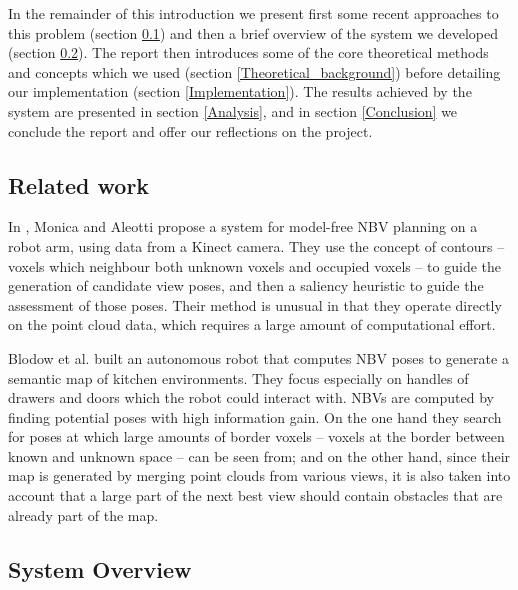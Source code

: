 In the remainder of this introduction we present first some recent approaches to this problem (section \ref{sub:related_work}) and then a brief overview of the system we developed (section \ref{sub:system_overview}).
The report then introduces some of the core theoretical methods and concepts which we used (section \ref{Theoretical_background}) before detailing our implementation (section \ref{Implementation}).
The results achieved by the system are presented in section \ref{Analysis}, and in section \ref{Conclusion} we conclude the report and offer our reflections on the project.

\subsection{Related work}
\label{sub:related_work}

In \cite{monica2017}, Monica and Aleotti propose a system for model-free NBV planning on a robot arm, using data from a Kinect camera.
They use the concept of contours -- voxels which neighbour both unknown voxels and occupied voxels -- to guide the generation of candidate view poses, and then a saliency heuristic to guide the assessment of those poses.
Their method is unusual in that they operate directly on the point cloud data, which requires a large amount of computational effort.

Blodow et al. \cite{blodow2011autonomous} built an autonomous robot that computes NBV poses to generate a semantic map of kitchen environments.
They focus especially on handles of drawers and doors which the robot could interact with.
NBVs are computed by finding potential poses with high information gain. On the one hand they search for poses at which large amounts of border voxels -- voxels at the border between known and unknown space -- can be seen from; and on the other hand, since their map is generated by merging point clouds from various views, it is also taken into account that a large part of the next best view should contain obstacles that are already part of the map.

\subsection{System Overview} %
\label{sub:system_overview}

